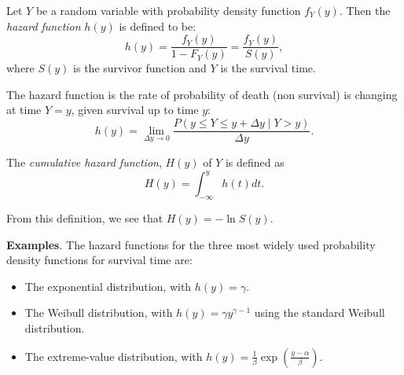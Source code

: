 \documentclass[12pt]{article}
\begin{document}
Let $Y$ be a random variable with probability density function $f_Y(y)$.  Then the \emph{hazard function} $h(y)$ is defined to be:
$$h(y) = \frac{f_Y(y)}{1 - F_Y(y)} = \frac{f_Y(y)}{S(y)},$$
where $S(y)$ is the survivor function and $Y$ is the survival time.

The hazard function is the rate of probability of death (non survival) is changing at time $Y=y$, given survival up to time $y$:
$$h(y) = \lim_{\Delta y\rightarrow 0} \frac
{P(y\leq Y \leq y+\Delta y \mid Y > y)}{\Delta y}.$$

The \emph{cumulative hazard function}, $H(y)$ of $Y$ is defined as 
$$H(y) = \int_{-\infty}^{y} h(t) dt.$$

From this definition, we see that $H(y)=-\operatorname{ln}S(y)$.

\textbf{Examples}.
The hazard functions for the three most widely used probability density functions for survival time are:

\begin{itemize}
\item The exponential distribution, with $h(y)=\gamma$.
\item The Weibull distribution, with $h(y)=\gamma y^{\gamma-1}$ using the standard Weibull distribution.
\item The extreme-value distribution, with $h(y)=\frac{1}{\beta}\operatorname{exp}(\frac{y-\alpha}{\beta})$.
\end{itemize}
\end{document}
